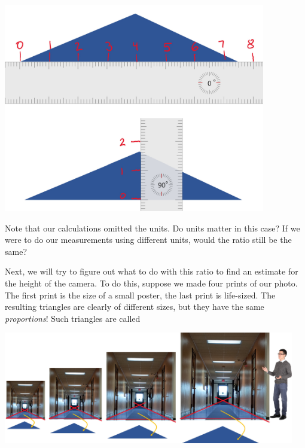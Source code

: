 \documentclass{ximera}
\begin{document}
\begin{exploration}
\begin{image}
         \includegraphics[width=4.5in]{triangleMeasures1.jpg}
\end{image}

\begin{question}
    Note that our calculations omitted the units.  Do units matter in this case?  If we were to do our measurements using different units, would the ratio still be the same? 
\end{question} 

Next, we will try to figure out what to do with this ratio to find an estimate for the height of the camera.  To do this, suppose we made four prints of our photo.  The first print is the size of a small poster, the last print is life-sized.  The resulting triangles are clearly of different sizes, but they have the same \emph{proportions}!  Such triangles are called 

\begin{image}
         \includegraphics[width=5in]{similarHallways.jpg}
\end{image}


\end{exploration}
\end{document}
